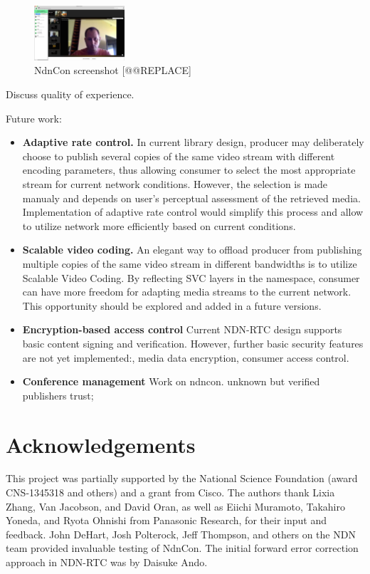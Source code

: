 \documentclass{icn/sig-alternate-2012} %
\newcommand{\ndnrtcName}{NDN-RTC} %
\newcommand{\ndnconName}{NdnCon}
\begin{document}
\begin{figure}[t!]
\centering
\includegraphics[width=0.3\textwidth]{ndncon}
\caption{\ndnconName{} screenshot [@@REPLACE]}
\label{fig:ndncon}
\end{figure}


Discuss quality of experience. 

Future work: 
\begin{itemize}[label={}]
\item \textbf{Adaptive rate control.} In current library design, producer may deliberately choose to publish several copies of the same video stream with different encoding parameters, thus allowing consumer to select the most appropriate stream for current network conditions. However, the selection is made manualy and depends on user's perceptual assessment of the retrieved media. Implementation of adaptive rate control would simplify this process and allow to utilize network more efficiently based on current conditions.

\item \textbf{Scalable video coding.} An elegant way to offload producer from publishing multiple copies of the same video stream in different bandwidths is to utilize Scalable Video Coding. By reflecting SVC layers in the namespace, consumer can have more freedom for adapting media streams to the current network. This opportunity should be explored and added in a future versions.

\item \textbf{Encryption-based access control} Current \ndnrtcName{} design supports basic content signing and verification. However, further basic security features are not yet implemented:, media data encryption, consumer access control.

\item \textbf{Conference management} 
Work on ndncon. unknown but verified publishers trust; 
\end{itemize}


\section{Acknowledgements}
\label{sec:Acknowledgements}
This project was partially supported by the National Science Foundation (award CNS-1345318 and others) and a grant from Cisco.   The authors thank Lixia Zhang, Van Jacobson, and David Oran, as well as Eiichi Muramoto, Takahiro Yoneda, and Ryota Ohnishi from Panasonic Research, for their input and feedback. John DeHart, Josh Polterock, Jeff Thompson, and others on the NDN team provided invaluable testing of \ndnconName{}.  The initial forward error correction approach in \ndnrtcName{} was by Daisuke Ando. 



\end{document}
